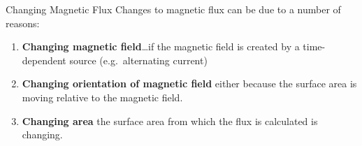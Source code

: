 \documentclass[12pt,aspectratio=169]{beamer}
\newcommand{\pic}[2]{\texttt{[image: \#2]}}
\newcommand{\mb}[1]{\mathbf{#1}}
\newcommand{\eq}[2]{\vspace{#1}{\Large\begin{displaymath}#2\end{displaymath}}}
\begin{document}
%
%  
%
%  
%
%
%
%
%


\begin{frame}{Changing Magnetic Flux}
  Changes to magnetic flux can be due to a number of reasons:
  \begin{enumerate}
  \item\textbf{Changing magnetic field}\ldots if the magnetic field is created
    by a time-dependent source (e.g.\ alternating current)
  \item\textbf{Changing orientation of magnetic field} either because the
    surface area is moving relative to the magnetic field.
  \item\textbf{Changing area} the surface area from which the flux is
    calculated is changing.
  \end{enumerate}
\end{frame}
\end{document}
